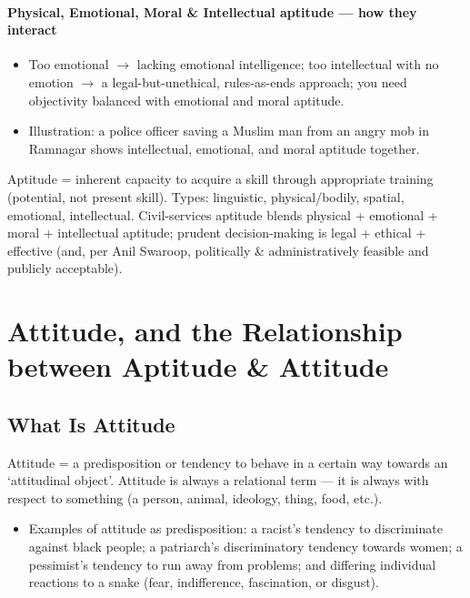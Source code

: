 \paragraph{Physical, Emotional, Moral \& Intellectual aptitude --- how they interact}
\begin{itemize}
\item Too emotional $\rightarrow$ lacking emotional intelligence; too intellectual with no emotion $\rightarrow$ a legal-but-unethical, rules-as-ends approach; you need objectivity balanced with emotional and moral aptitude.
\item Illustration: a police officer saving a Muslim man from an angry mob in Ramnagar shows intellectual, emotional, and moral aptitude together.
\end{itemize}

\begin{QuickRevision}
Aptitude = inherent capacity to acquire a skill through appropriate training (potential, not present skill). Types: linguistic, physical/bodily, spatial, emotional, intellectual. Civil-services aptitude blends physical + emotional + moral + intellectual aptitude; prudent decision-making is legal + ethical + effective (and, per Anil Swaroop, politically \& administratively feasible and publicly acceptable).
\end{QuickRevision}

\section{Attitude, and the Relationship between Aptitude \& Attitude}

\subsection{What Is Attitude}

\begin{KeyConcept}
Attitude = a predisposition or tendency to behave in a certain way towards an `attitudinal object'. Attitude is always a relational term --- it is always with respect to something (a person, animal, ideology, thing, food, etc.).
\end{KeyConcept}

\begin{itemize}
\item Examples of attitude as predisposition: a racist's tendency to discriminate against black people; a patriarch's discriminatory tendency towards women; a pessimist's tendency to run away from problems; and differing individual reactions to a snake (fear, indifference, fascination, or disgust).
\end{itemize}

